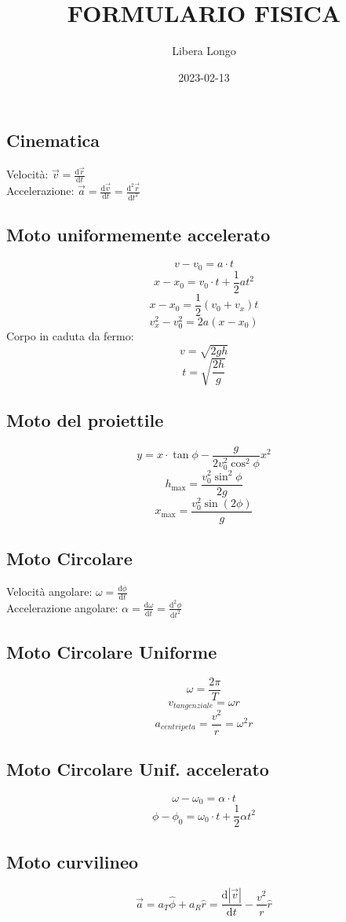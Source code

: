\documentclass{article}
\title{FORMULARIO FISICA}
\date{2023-02-13}
\author{Libera Longo}
\begin{document}
	\begin{small}
	\begin{multicols}{3}
\section{Cinematica}
		Velocità: $ \vec v = \frac{ \mathrm d \vec r }{ \mathrm d t } $ \\
		Accelerazione: $ \vec a = \frac{ \mathrm d \vec v }{ \mathrm d t } = \frac{ \mathrm d^2 \vec r }{ \mathrm d t^2 } $
	\subsection{Moto uniformemente accelerato}
		\[ v - v_0 = a \cdot t \]
		\[ x - x_0 = v_0 \cdot t + \frac{1}{2} a t^2 \]
		\[ x - x_0 = \frac{1}{2} (v_0 + v_x) t \]
		\[ v_x^2 - v_0^2 = 2 a (x - x_0) \]
		Corpo in caduta da fermo:
		\[ v = \sqrt{ 2 g h } \]
		\[ t = \sqrt{ \frac{ 2h }{ g } } \]
	\subsection{Moto del proiettile}
		\[ y = x \cdot \tan \phi - \frac{ g }{ 2 v_0^2 \cos^2 \phi } x^2 \]
		\[ h_{\max} = \frac{ v_0^2 \sin^2 \phi }{ 2 g } \]
		\[ x_{\max} = \frac{ v_0^2 \sin( 2 \phi ) }{ g } \]
	\subsection{Moto Circolare}
		Velocità angolare: $ \omega = \frac{ \mathrm d \phi }{ \mathrm d t } $ \\
		Accelerazione angolare: $ \alpha = \frac{ \mathrm d \omega }{ \mathrm d t } = \frac { \mathrm d^2 \phi }{ \mathrm d t^2 } $
	\subsection{Moto Circolare Uniforme}
		\[ \omega = \frac{ 2 \pi }{ T } \]
		\[ v_{tangenziale} = \omega r \]
		\[ a_{centripeta} = \frac{ v^2 }{ r } = \omega^2 r \]
	\subsection{Moto Circolare Unif. accelerato}
		\[ \omega - \omega_0 = \alpha \cdot t \]
		\[ \phi - \phi_0 = \omega_0 \cdot t + \frac{1}{2} \alpha t^2 \]
	\subsection{Moto curvilineo}
		\[ \vec a = a_T \hat \phi + a_R \hat r = \frac{ \mathrm d | \vec v | }{ \mathrm d t } - \frac{ v^2 }{ r } \hat r \]

\end{multicols}
\end{small}
\end{document}
